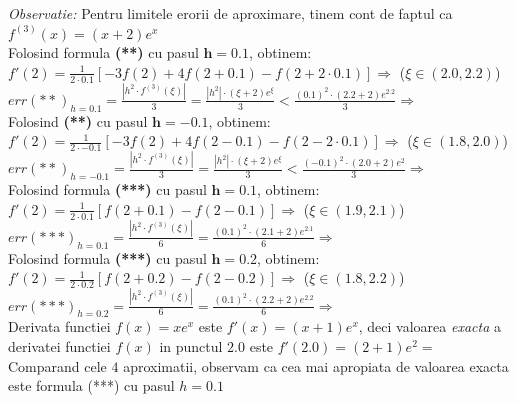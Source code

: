 \documentclass{article}
\begin{document}
\textit{Observatie:} Pentru limitele erorii de aproximare, tinem cont de faptul ca $f^{(3)}(x) = (x+2)e^x$\\

Folosind formula \textbf{(**)} cu pasul $\mathbf{h=0.1}$, obtinem:
\tabto{1cm}$f'(2) = \frac{1}{2 \cdot 0.1} [-3f(2) + 4f(2+0.1) - f(2+ 2\cdot 0.1)]\Rightarrow$  ($\xi \in (2.0, 2.2)$)
\tabto{1cm}$err(**)_{h=0.1} = \frac{|h^2 \cdot f^{(3)}(\xi)|}{3} = \frac{|h^2| \cdot (\xi+2)e^{\xi}}{3} < \frac{(0.1)^2 \cdot (2.2+2)e^{2.2}}{3} \Rightarrow$ \\


Folosind \textbf{(**)} cu pasul $\mathbf{h=-0.1}$, obtinem:
\tabto{1cm}$f'(2) = \frac{1}{2 \cdot -0.1} [-3f(2) + 4f(2-0.1) - f(2- 2\cdot 0.1)]\Rightarrow$  ($\xi \in (1.8, 2.0)$)
\tabto{1cm}$err(**)_{h=-0.1} = \frac{|h^2 \cdot f^{(3)}(\xi)|}{3} = \frac{|h^2| \cdot (\xi+2)e^{\xi}}{3} < \frac{(-0.1)^2 \cdot (2.0+2)e^2}{3} \Rightarrow$ \\


Folosind formula \textbf{(***)} cu pasul $\mathbf{h=0.1}$, obtinem:
\tabto{1cm}$f'(2) = \frac{1}{2 \cdot 0.1} [f(2+0.1) - f(2-0.1)]\Rightarrow$  ($\xi \in (1.9, 2.1)$)
\tabto{1cm}$err(***)_{h=0.1} = \frac{|h^2 \cdot f^{(3)}(\xi)|}{6} = \frac{(0.1)^2 \cdot (2.1+2)e^{2.1}}{6} \Rightarrow$ \\

Folosind formula \textbf{(***)} cu pasul $\mathbf{h=0.2}$, obtinem:
\tabto{1cm}$f'(2) = \frac{1}{2 \cdot 0.2} [f(2+0.2) - f(2-0.2)]\Rightarrow$  ($\xi \in (1.8, 2.2)$)
\tabto{1cm}$err(***)_{h=0.2} = \frac{|h^2 \cdot f^{(3)}(\xi)|}{6} = \frac{(0.1)^2 \cdot (2.2+2)e^{2.2}}{6} \Rightarrow$ \\


Derivata functiei $f(x) = xe^x$ este $f'(x) = (x+1)e^x$, deci valoarea \textit{exacta} a derivatei functiei $f(x)$ in punctul $2.0$ este $f'(2.0) = (2+1)e^2 =$ \\

Comparand cele $4$ aproximatii, observam ca cea mai apropiata de valoarea exacta este formula (***) cu pasul $h=0.1$
\end{document}
